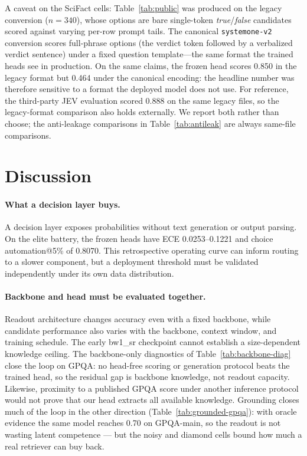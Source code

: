 \documentclass[11pt]{article}
\begin{document}
A caveat on the SciFact cells: Table~\ref{tab:public} was produced on
the legacy conversion ($n{=}340$), whose options are bare
single-token \emph{true}/\emph{false} candidates scored against
varying per-row prompt tails. The canonical \texttt{systemone-v2}
conversion scores full-phrase options (the verdict token followed by a
verbalized verdict sentence) under a fixed question template---the
same format the trained heads see in production. On the same claims,
the frozen head scores 0.850 in the legacy format but 0.464 under the
canonical encoding: the headline number was therefore sensitive to a
format the deployed model does not use. For reference, the third-party
JEV evaluation scored 0.888 on the same legacy files, so the
legacy-format comparison also holds externally. We report both rather
than choose; the anti-leakage comparisons in Table~\ref{tab:antileak}
are always same-file comparisons.

\section{Discussion}

\paragraph{What a decision layer buys.}
A decision layer exposes probabilities without text generation or output
parsing. On the elite battery, the frozen heads have ECE 0.0253--0.1221
and choice automation@5\% of 0.8070. This retrospective operating curve
can inform routing to a slower component, but a deployment threshold
must be validated independently under its own data distribution.

\paragraph{Backbone and head must be evaluated together.}
Readout architecture changes accuracy even with a fixed backbone, while
candidate performance also varies with the backbone, context window,
and training schedule. The early bw1\_sr checkpoint cannot establish a
size-dependent knowledge ceiling. The backbone-only diagnostics of
Table~\ref{tab:backbone-diag} close the loop on GPQA: no head-free
scoring or generation protocol beats the trained head, so the residual
gap is backbone knowledge, not readout capacity. Likewise, proximity to
a published GPQA score under another inference protocol would not prove
that our head extracts all available knowledge. Grounding closes much
of the loop in the other direction (Table~\ref{tab:grounded-gpqa}):
with oracle evidence the same model reaches 0.70 on GPQA-main, so the
readout is not wasting latent competence --- but the noisy and
diamond cells bound how much a real retriever can buy back.
\end{document}
